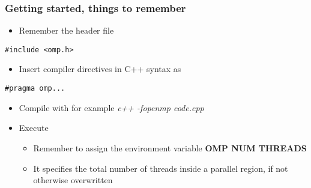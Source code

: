 \documentclass{beamer}
\begin{document}
\begin{frame}
\frametitle{Getting started, things to remember}

\begin{block}{}
\begin{itemize}
 \item Remember the header file 
\end{itemize}

\noindent


\begin{verbatim}
#include <omp.h>

\end{verbatim}

\begin{itemize}
 \item Insert compiler directives in C++ syntax as 
\end{itemize}

\noindent


\begin{verbatim}
#pragma omp...

\end{verbatim}

\begin{itemize}
\item Compile with for example \emph{c++ -fopenmp code.cpp}

\item Execute
\begin{itemize}

  \item Remember to assign the environment variable \textbf{OMP NUM THREADS}

  \item It specifies the total number of threads inside a parallel region, if not otherwise overwritten
\end{itemize}

\noindent
\end{itemize}

\noindent
\end{block}
\end{frame}
\end{document}
